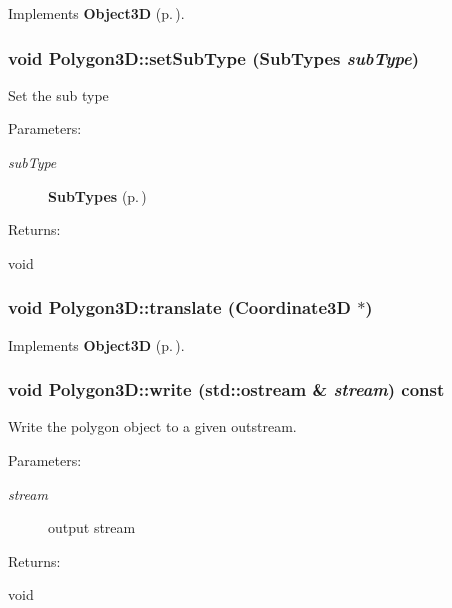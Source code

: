 Implements {\bf Object3D} {\rm (p.\,\pageref{classObject3D_a1})}.
\subsubsection{\setlength{\rightskip}{0pt plus 5cm}void Polygon3D::set\-Sub\-Type ({\bf Sub\-Types} {\em sub\-Type})\hspace{0.3cm}{\tt  [inline, protected]}}\label{classPolygon3D_b0}


Set the sub type \begin{Desc}
\item[Parameters: ]\par
\begin{description}
\item[{\em 
sub\-Type}]{\bf Sub\-Types} {\rm (p.\,\pageref{classPolygon3D_s5})} \end{description}
\end{Desc}
\begin{Desc}
\item[Returns: ]\par
void \end{Desc}
\subsubsection{\setlength{\rightskip}{0pt plus 5cm}void Polygon3D::translate ({\bf Coordinate3D} $\ast$)\hspace{0.3cm}{\tt  [virtual]}}\label{classPolygon3D_a7}




Implements {\bf Object3D} {\rm (p.\,\pageref{classObject3D_a3})}.
\subsubsection{\setlength{\rightskip}{0pt plus 5cm}void Polygon3D::write (std::ostream \& {\em stream}) const\hspace{0.3cm}{\tt  [virtual]}}\label{classPolygon3D_a8}


Write the polygon object to a given outstream. \begin{Desc}
\item[Parameters: ]\par
\begin{description}
\item[{\em 
stream}]output stream \end{description}
\end{Desc}
\begin{Desc}
\item[Returns: ]\par
void \end{Desc}


